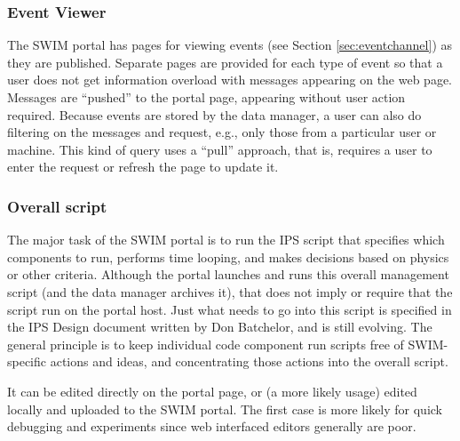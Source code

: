 \subsubsection{Event Viewer}
The SWIM portal has pages for viewing events (see Section \ref{sec:eventchannel})
as they are published.  Separate pages are provided for each type of event so
that a user does not get information overload with messages appearing on the web page.
Messages are ``pushed'' to the portal page, appearing without user action
required.
Because events are stored by the data manager, a user can also do filtering on
the messages and request, e.g., only those from a particular user or machine. 
This kind of query uses a ``pull'' approach, that is, requires a user to enter
the request or refresh the page to update it.

\subsubsection{Overall script}
The major task of the SWIM portal is to run the IPS script that specifies which
components to run, performs time looping, and makes decisions based on physics
or other criteria. Although the portal launches and runs this overall management
script (and the data manager archives it), that does not imply or require that
the script run on the portal host. Just what needs to go into this script is
specified in the IPS Design document written by Don Batchelor, and is still
evolving. The general principle is to keep individual code component run scripts
free of SWIM-specific actions and ideas, and concentrating those actions into
the overall script.

It can be edited directly on the portal page, or (a more likely usage) edited locally and
uploaded to the SWIM portal. The first case is more likely for quick debugging
and experiments since web interfaced editors generally are poor. 

